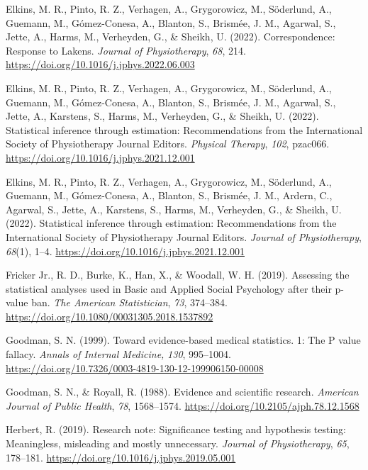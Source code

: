 \documentclass[]{cik}%
\newlength{\cslhangindent}
\newlength{\cslentryspacingunit} %
\newenvironment{CSLReferences}[2] %
 {%
  \setlength{\parindent}{0pt}
  \ifodd #1
  \let\oldpar\par
  \def\par{\hangindent=\cslhangindent\oldpar}
  \fi
  \setlength{\parskip}{#2\cslentryspacingunit}
 }%
 {}
\begin{document}
\begin{CSLReferences}{1}{0}
\leavevmode{}%
Elkins, M. R., Pinto, R. Z., Verhagen, A., Grygorowicz, M., Söderlund,
A., Guemann, M., Gómez-Conesa, A., Blanton, S., Brismée, J. M., Agarwal,
S., Jette, A., Harms, M., Verheyden, G., \& Sheikh, U. (2022).
Correspondence: Response to Lakens. \emph{Journal of Physiotherapy},
\emph{68}, 214. \url{https://doi.org/10.1016/j.jphys.2022.06.003}

\leavevmode{}%
Elkins, M. R., Pinto, R. Z., Verhagen, A., Grygorowicz, M., Söderlund,
A., Guemann, M., Gómez-Conesa, A., Blanton, S., Brismée, J. M., Agarwal,
S., Jette, A., Karstens, S., Harms, M., Verheyden, G., \& Sheikh, U.
(2022). Statistical inference through estimation: Recommendations from
the International Society of Physiotherapy Journal Editors.
\emph{Physical Therapy}, \emph{102}, pzac066.
\url{https://doi.org/10.1016/j.jphys.2021.12.001}

\leavevmode{}%
Elkins, M. R., Pinto, R. Z., Verhagen, A., Grygorowicz, M., Söderlund,
A., Guemann, M., Gómez-Conesa, A., Blanton, S., Brismée, J. M., Ardern,
C., Agarwal, S., Jette, A., Karstens, S., Harms, M., Verheyden, G., \&
Sheikh, U. (2022). Statistical inference through estimation:
Recommendations from the International Society of Physiotherapy Journal
Editors. \emph{Journal of Physiotherapy}, \emph{68}(1), 1--4.
\url{https://doi.org/10.1016/j.jphys.2021.12.001}

\leavevmode{}%
Fricker Jr., R. D., Burke, K., Han, X., \& Woodall, W. H. (2019).
Assessing the statistical analyses used in Basic and Applied Social
Psychology after their p-value ban. \emph{The American Statistician},
\emph{73}, 374--384. \url{https://doi.org/10.1080/00031305.2018.1537892}

\leavevmode{}%
Goodman, S. N. (1999). Toward evidence-based medical statistics. 1: The
P value fallacy. \emph{Annals of Internal Medicine,} \emph{130},
995--1004.
\url{https://doi.org/10.7326/0003-4819-130-12-199906150-00008}

\leavevmode{}%
Goodman, S. N., \& Royall, R. (1988). Evidence and scientific research.
\emph{American Journal of Public Health}, \emph{78}, 1568--1574.
\url{https://doi.org/10.2105/ajph.78.12.1568}

\leavevmode{}%
Herbert, R. (2019). Research note: Significance testing and hypothesis
testing: Meaningless, misleading and mostly unnecessary. \emph{Journal
of Physiotherapy}, \emph{65}, 178--181.
\url{https://doi.org/10.1016/j.jphys.2019.05.001}


\end{CSLReferences}
\end{document}
